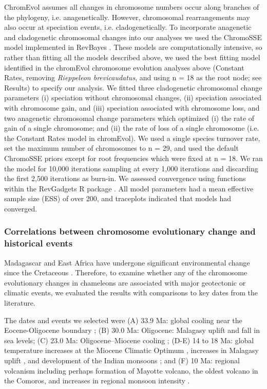 \documentclass[a4paper, 12pt]{article}
\begin{document}
ChromEvol assumes all changes in chromosome numbers occur along branches of the phylogeny, i.e. anagenetically. 
However, chromosomal rearrangements may also occur at speciation events, i.e. cladogenetically. 
To incorporate anagenetic and cladogenetic chromosomal changes into our analyses we used the ChromoSSE model \citep{freyman2018cladogenetic} implemented in RevBayes \citep{10.1093/sysbio/syw021}. 
These models are computationally intensive, so rather than fitting all the models described above, we used the best fitting model identified in the chromEvol chromosome evolution analyses above (Constant Rates, removing \textit{Rieppeleon brevicaudatus}, and using n = 18 as the root node; see Results) to specify our analysis. 
We fitted three cladogenetic chromosomal change parameters (i) speciation without chromosomal changes, (ii) speciation associated with chromosome gain, and (iii) speciation associated with chromosome loss, and two anagenetic chromosomal change parameters which optimized (i) the rate of gain of a single chromosome; and (ii) the rate of loss of a single chromosome (i.e. the Constant Rates model in chromEvol). 
We used a single species turnover rate, set the maximum number of chromosomes to n = 29, and used the default ChromoSSE priors except for root frequencies which were fixed at n = 18. 
We ran the model for 10,000 iterations sampling at every 1,000 iterations and discarding the first 2,500 iterations as burn-in. 
We assessed convergence using functions within the RevGadgets R package \citep{https://doi.org/10.1111/2041-210X.13750}. 
All model parameters had a mean effective sample size (ESS) of over 200, and traceplots indicated that models had converged.

\subsubsection{Correlations between chromosome evolutionary change and historical events}
Madagascar and East Africa have undergone significant environmental change since the Cretaceous \citep[e.g.][]{ohba2016madagascar,linder2017east,genin2022co,jiao2023linking}. 
Therefore, to examine whether any of the chromosome evolutionary changes in chameleons are associated with major geotectonic or climatic events, we evaluated the results with comparisons to key dates from the literature. 

The dates and events we selected were (A) 33.9 Ma: global cooling near the Eocene-Oligocene boundary \citep[Grande Coupure;][]{liu2009global,samonds2013imperfect}; (B) 30.0 Ma: Oligocene: Malagasy uplift \citep{stephenson2021cenozoic} and fall in sea levels; (C) 23.0 Ma: Oligocene–Miocene cooling \citep{zachos1997orbitally}; (D-E) 14 to 18 Ma: global temperature increases at the Miocene Climatic Optimum \citep{zhou2012out}, increases in Malagasy uplift \citep{stephenson2021cenozoic,jiao2023linking}, and development of the Indian monsoons \citep{samonds2013imperfect}; and (F) 10 Ma: regional volcanism \citep{michon2016volcanism} including perhaps formation of Mayotte volcano, the oldest volcano in the Comoros, and increases in regional monsoon intensity \citep[but see][]{masquelet2022east}. 
\end{document}
